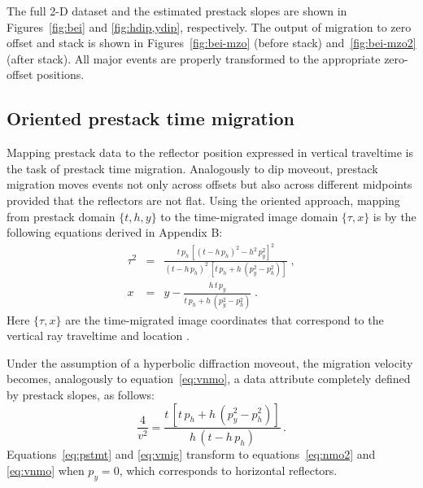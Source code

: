 
The full 2-D dataset and the estimated prestack slopes are shown in
Figures~\ref{fig:bei} and \ref{fig:hdip,ydip}, respectively. The
output of migration to zero offset and stack is shown in
Figures~\ref{fig:bei-mzo} (before stack) and~\ref{fig:bei-mzo2} (after
stack). All major events are properly transformed to the appropriate
zero-offset positions.



\subsection{Oriented prestack time migration}

Mapping prestack data to the reflector position expressed in vertical
traveltime is the task of prestack time migration. %
Analogously to dip moveout, prestack migration moves events not only
across offsets %
but also across different midpoints provided that the reflectors are
not flat. Using the oriented approach, mapping from  prestack
domain $\{t,h,y\}$ to the time-migrated image domain $\{\tau,x\}$ is
  by the following equations derived in Appendix B:
\begin{eqnarray}
  \label{eq:pstmt}
  \tau^2 & = & 
  \frac{t\,p_h\,\left[(t-h\,p_h)^2 - h^2\,p_y^2\right]^2}
  {(t-h\,p_h)^2\,\left[t\,p_h + h\,(p_y^2-p_h^2)\right]}\;, \\
  \label{eq:pstmx}  
  x & = & y - \frac{h\,t\,p_y}{t\,p_h + h\,(p_y^2-p_h^2)}\;.
\end{eqnarray}
Here $\{\tau,x\}$ are the time-migrated image coordinates that
correspond to the vertical ray traveltime and location
\cite[]{GPR25-04-07380745}.

Under the assumption of a hyperbolic diffraction moveout, the migration velocity
becomes, analogously to equation~\ref{eq:vnmo}, a data attribute completely
defined by prestack slopes, as follows:
\begin{equation}
  \label{eq:vmig}
  \frac{4}{v^2} = \frac{t\,\left[t\,p_h + h\,(p_y^2-p_h^2)\right]}
  {h\,(t-h\,p_h)}\,.
\end{equation}
Equations~\ref{eq:pstmt} and \ref{eq:vmig} transform to
equations~\ref{eq:nmo2} and \ref{eq:vnmo} when $p_y=0$, which
corresponds to horizontal reflectors. 

